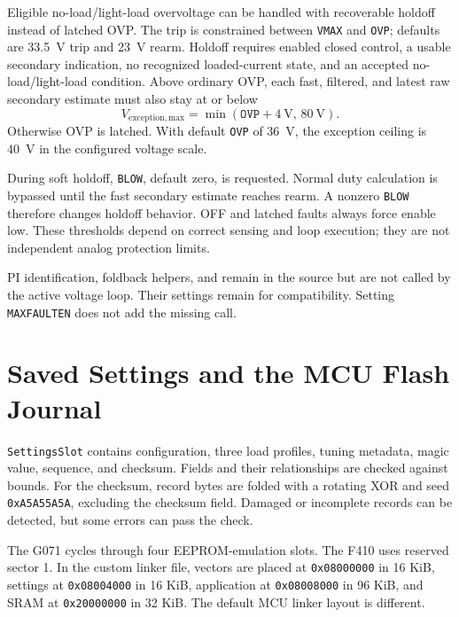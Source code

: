 Eligible no-load/light-load overvoltage can be handled with recoverable holdoff instead of latched OVP. The trip is constrained between \texttt{VMAX} and \texttt{OVP}; defaults are \SI{33.5}{\volt} trip and \SI{23}{\volt} rearm. Holdoff requires enabled closed control, a usable secondary indication, no recognized loaded-current state, and an accepted no-load/light-load condition. Above ordinary OVP, each fast, filtered, and latest raw secondary estimate must also stay at or below
\begin{equation}
 V_{\mathrm{exception,max}}=\min(\texttt{OVP}+\SI{4}{\volt},\,\SI{80}{\volt}).
 \label{eq:app-fw-ovp-exception}
\end{equation}
Otherwise OVP is latched. With default \texttt{OVP} of \SI{36}{\volt}, the exception ceiling is \SI{40}{\volt} in the configured voltage scale.

During soft holdoff, \texttt{BLOW}, default zero, is requested. Normal duty calculation is bypassed until the fast secondary estimate reaches rearm. A nonzero \texttt{BLOW} therefore changes holdoff behavior. OFF and latched faults always force enable low. These thresholds depend on correct sensing and loop execution; they are not independent analog protection limits.

PI identification, foldback helpers, and  remain in the source but are not called by the active voltage loop. Their settings remain for compatibility. Setting \texttt{MAXFAULTEN} does not add the missing call.

\section{Saved Settings and the MCU Flash Journal}
\label{sec:app-fw-persistence}

\texttt{SettingsSlot} contains configuration, three load profiles, tuning metadata, magic value, sequence, and checksum. Fields and their relationships are checked against bounds. For the checksum, record bytes are folded with a rotating XOR and seed \texttt{0xA5A55A5A}, excluding the checksum field. Damaged or incomplete records can be detected, but some errors can pass the check.

The G071 cycles through four EEPROM-emulation slots. The F410 uses reserved sector 1. In the custom linker file, vectors are placed at \texttt{0x08000000} in 16 KiB, settings at \texttt{0x08004000} in 16 KiB, application at \texttt{0x08008000} in 96 KiB, and SRAM at \texttt{0x20000000} in 32 KiB. The default MCU linker layout is different.

